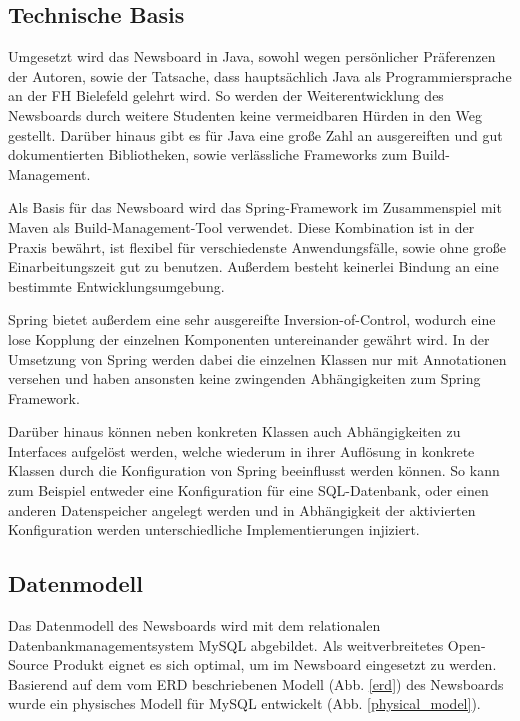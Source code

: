 \subsection{Technische Basis}
Umgesetzt wird das Newsboard in Java, sowohl wegen persönlicher Präferenzen der Autoren,
sowie der Tatsache, dass hauptsächlich Java als Programmiersprache
an der FH Bielefeld gelehrt wird. So werden der Weiterentwicklung des Newsboards
durch weitere Studenten keine vermeidbaren Hürden in den Weg gestellt.
Darüber hinaus gibt es für Java eine große Zahl an ausgereiften
und gut dokumentierten Bibliotheken, sowie verlässliche Frameworks zum 
Build-Management.

Als Basis für das Newsboard wird das Spring-Framework im Zusammenspiel mit Maven
als Build-Management-Tool verwendet. Diese Kombination ist in der Praxis bewährt,
ist flexibel für verschiedenste Anwendungsfälle, sowie ohne große Einarbeitungszeit
gut zu benutzen. Außerdem besteht keinerlei Bindung an eine bestimmte Entwicklungsumgebung.

Spring bietet außerdem eine sehr ausgereifte Inversion-of-Control, wodurch eine
lose Kopplung der einzelnen Komponenten untereinander gewährt wird\cite{fowler-ioc}.
In der Umsetzung von Spring werden dabei die einzelnen Klassen nur mit
Annotationen versehen und haben ansonsten keine zwingenden Abhängigkeiten
zum Spring Framework.

Darüber hinaus können neben konkreten Klassen auch Abhängigkeiten zu Interfaces
aufgelöst werden, welche wiederum in ihrer Auflösung in konkrete Klassen
durch die Konfiguration von Spring beeinflusst werden können.
So kann zum Beispiel entweder eine Konfiguration für eine SQL-Datenbank,
oder einen anderen Datenspeicher angelegt werden und in Abhängigkeit
der aktivierten Konfiguration werden unterschiedliche Implementierungen injiziert.

\subsection{Datenmodell}
Das Datenmodell des Newsboards wird mit dem relationalen Datenbankmanagementsystem MySQL
abgebildet. Als weitverbreitetes Open-Source Produkt eignet es sich optimal, um im
Newsboard eingesetzt zu werden. Basierend auf dem vom ERD beschriebenen Modell
(Abb. \ref{erd}) des Newsboards wurde ein physisches Modell für MySQL entwickelt
(Abb. \ref{physical_model}).

